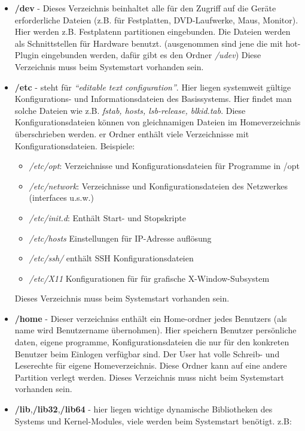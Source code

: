 \begin{itemize}
\begin{itemize}
			\item \textbf{/dev} - Dieses Verzeichnis beinhaltet alle für den Zugriff
			auf die Geräte erforderliche Dateien (z.B. für  Festplatten, DVD-Laufwerke, Maus, Monitor).
			Hier werden z.B. Festplatenn partitionen eingebunden. Die Dateien werden als Schnittstellen
			für Hardware benutzt.
			(ausgenommen sind jene die mit hot-Plugin eingebunden werden, dafür gibt es den Ordner \textit{/udev})
			Diese Verzeichnis muss beim Systemstart vorhanden sein.
			\item \textbf{/etc} - steht für \textit{``editable text configuration''}.
			Hier liegen systemweit gültige Konfigurations- und Informationsdateien des Basissystems.
			Hier findet man solche Dateien wie z.B. \textit{fstab, hosts, lsb-release, blkid.tab}.
			Diese Konfigurationsdateien können von gleichnamigen Dateien im Homeverzeichnis überschrieben werden.
			er Ordner enthält viele Verzeichnisse mit Konfigurationsdateien.
			Beispiele:
			\begin{itemize}
				\item \textit{/etc/opt}: Verzeichnisse und Konfigurationsdateien für Programme in /opt
				\item \textit{/etc/network}: Verzeichnisse und Konfigurationsdateien des Netzwerkes (interfaces u.s.w.)
				\item \textit{/etc/init.d}: Enthält Start- und Stopskripte
				\item \textit{/etc/hosts} Einstellungen für IP-Adresse auflösung
				\item \textit{/etc/ssh/} enthält SSH Konfigurationsdateien
				\item \textit{/etc/X11} Konfigurationen für für grafische X-Window-Subsystem
			\end{itemize}
			Dieses Verzeichnis muss beim Systemstart vorhanden sein.
			\item \textbf{/home} - Dieser verzeichniss enthält ein Home-ordner jedes Benutzers
			(als name wird Benutzername übernohmen). Hier speichern Benutzer persönliche daten, eigene programme,
			Konfigurationsdateien die nur für den konkreten Benutzer beim Einlogen verfügbar sind.
			Der User hat volle Schreib- und Leserechte für eigene Homeverzeichnis.
			Diese Ordner kann auf eine andere Partition verlegt werden.
			Dieses Verzeichnis muss nicht beim Systemstart vorhanden sein.
			\item \textbf{/lib},\textbf{/lib32},\textbf{/lib64}  - hier liegen wichtige dynamische Bibliotheken des Systems und Kernel-Modules,
			viele werden beim Systemstart benötigt. z.B:

\end{itemize}
\end{itemize}
